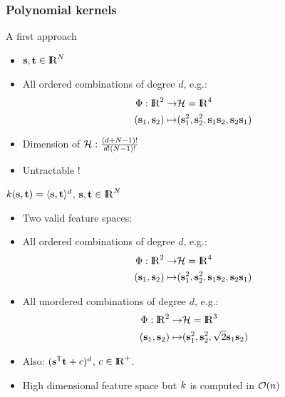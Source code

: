 \documentclass[11pt, pdf, compress, handout]{beamer}
\begin{document}
\begin{frame}[allowframebreaks]
  \frametitle{Polynomial kernels}
  \begin{block}{A first approach}
    \begin{itemize}
    \item ${\mathbf{s}},{\mathbf{t}}\in {\mathrm{I\hskip-2.2pt R}}^N$
    \item All ordered combinations of degree $d$, e.g.:
      \begin{align*}
        \Phi : {\mathrm{I\hskip-2.2pt R}}^2 \to& {\mathcal{H}} = {\mathrm{I\hskip-2.2pt R}}^4 \\
        ({\mathbf{s}}_1,{\mathbf{s}}_2) \mapsto & ({\mathbf{s}}_1^2,{\mathbf{s}}_2^2,{\mathbf{s}}_1{\mathbf{s}}_2,{\mathbf{s}}_2{\mathbf{s}}_1)
      \end{align*}
    \item Dimension of ${\mathcal{H}} : \frac{(d+N-1)!}{d! (N-1)!}$
    \item Untractable !
    \end{itemize}
  \end{block}
  \framebreak
  
  \begin{block}{${\mathnormal{k}}({\mathbf{s}},{\mathbf{t}}) = \langle {\mathbf{s}}, {\mathbf{t}} \rangle^d$, ${\mathbf{s}},{\mathbf{t}}\in {\mathrm{I\hskip-2.2pt R}}^N$}
    \begin{itemize}
    \item Two valid feature spaces:
    \item All ordered combinations of degree $d$, e.g.:
      \begin{align*}
        \Phi : {\mathrm{I\hskip-2.2pt R}}^2 \to& {\mathcal{H}} = {\mathrm{I\hskip-2.2pt R}}^4 \\
        ({\mathbf{s}}_1,{\mathbf{s}}_2) \mapsto & ({\mathbf{s}}_1^2,{\mathbf{s}}_2^2,{\mathbf{s}}_1{\mathbf{s}}_2,{\mathbf{s}}_2{\mathbf{s}}_1)
      \end{align*}
      \item All unordered combinations of degree $d$, e.g.:
      \begin{align*}
        \Phi : {\mathrm{I\hskip-2.2pt R}}^2 \to& {\mathcal{H}} = {\mathrm{I\hskip-2.2pt R}}^3 \\
        ({\mathbf{s}}_1,{\mathbf{s}}_2) \mapsto & ({\mathbf{s}}_1^2,{\mathbf{s}}_2^2,\sqrt{2}{\mathbf{s}}_1{\mathbf{s}}_2)
      \end{align*}
    \item Also: $({\mathbf{s}}^{\mathsf{T}}{\mathbf{t}} + c)^d$, $c \in {\mathrm{I\hskip-2.2pt R}}^+$.
    \item High dimensional feature space but ${\mathnormal{k}}$ is computed in $\mbox{$\mathcal{O}(n)$}$
    \end{itemize}
  \end{block}
  
\end{frame}   
\end{document}
